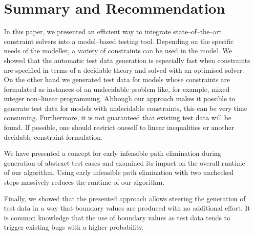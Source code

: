 \documentclass[runningheads,a4paper]{llncs}%
\begin{document}
\section{Summary and Recommendation}%
\label{sec:Recommendation}%
In this paper, we presented an efficient way to integrate state--of--the--art
constraint solvers into a model--based testing tool. Depending on the specific
needs of the modeller, a variety of constraints can be used in the model. We
showed that the automatic test data generation is especially fast when
constraints are specified in terms of a decidable theory and solved with an
optimised solver. On the other hand we generated test data for models whose
constraints are formulated as instances of an undecidable problem like, for
example, mixed integer non--linear programming. Although our approach makes it
possible to generate test data for models with undecidable constraints, this can
be very time consuming. Furthermore, it is not guaranteed that existing test
data will be found. If possible, one should restrict oneself to linear
inequalities or another decidable constraint formulation.

We have presented a concept for early infeasible path elimination during
generation of abstract test cases and examined its impact on the overall runtime
of our algorithm. Using early infeasible path elimination with two unchecked
steps massively reduces the runtime of our algorithm.

Finally, we showed that the presented approach allows steering the generation of
test data in a way that boundary values are produced with no additional effort.
It is common knowledge that the use of boundary values as test data tends to
trigger existing bugs with a higher probability.

%
%
\end{document}

